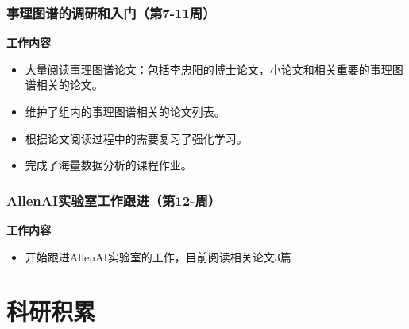 \documentclass[10pt,aspectratio=43,mathserif]{beamer}
\begin{document}
        \begin{frame}
		  \frametitle{\textbf{事理图谱的调研和入门（第7-11周）}}
            \begin{block}{\textbf{工作内容}}
                \begin{itemize}
                    \item 大量阅读事理图谱论文：包括李忠阳的博士论文，小论文和相关重要的事理图谱相关的论文。
                    \item 维护了组内的事理图谱相关的论文列表。
                    \item 根据论文阅读过程中的需要复习了强化学习。
                    \item 完成了海量数据分析的课程作业。
                \end{itemize}
            \end{block}
		\end{frame}

        \begin{frame}
		  \frametitle{\textbf{AllenAI实验室工作跟进（第12-周）}}
            \begin{block}{\textbf{工作内容}}
                \begin{itemize}
                    \item 开始跟进AllenAI实验室的工作，目前阅读相关论文3篇
                \end{itemize}
            \end{block}
		\end{frame}
		
\section[积累]{科研积累}
\end{document}
